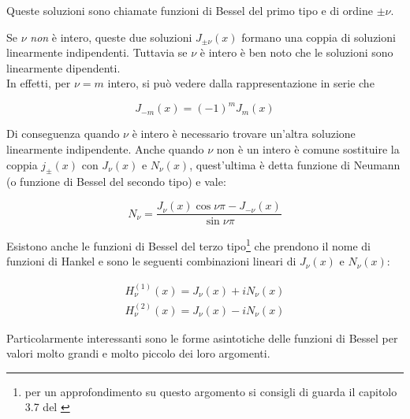 Queste soluzioni sono chiamate funzioni di Bessel del primo tipo e di ordine $\pm \nu$. 

Se $\nu$ \emph{non} è intero, queste due soluzioni $J_{\pm \nu} (x)$ formano una coppia di soluzioni linearmente indipendenti. Tuttavia se $\nu$ è intero è ben noto che le soluzioni sono linearmente dipendenti. \\
In effetti, per $\nu = m$ intero, si può vedere dalla rappresentazione in serie che 

\begin{equation}
    J_{-m}(x) = (-1)^m J_m(x)
\end{equation}

Di conseguenza quando $\nu$ è intero è necessario trovare un'altra soluzione linearmente indipendente. Anche quando $\nu$ non è un intero è comune sostituire la coppia $j_{\pm}(x)$ con $J_{\nu}(x)$ e $N_{\nu} (x)$, quest'ultima è detta funzione di Neumann (o funzione di Bessel del secondo tipo) e vale: 

\begin{tcolorbox}[colback=yellow!10!white, colframe=orange!70!black, boxrule=0.8pt]
\begin{equation}
    N_{\nu} = \frac{J_{\nu}(x) \cos{\nu \pi} - J_{-\nu} (x)}{\sin{\nu \pi}}
\end{equation}
\end{tcolorbox}

Esistono anche le funzioni di Bessel del terzo tipo\footnote{per un approfondimento su questo argomento si consigli di guarda il capitolo 3.7 del \cite{ElettrodinamicaClassica}} che prendono il nome di funzioni di Hankel e sono le seguenti combinazioni lineari di $J_{\nu}(x)$ e $N_{\nu}(x)$:

\begin{tcolorbox}[colback=yellow!10!white, colframe=orange!70!black, boxrule=0.8pt]
\begin{equation}
\begin{array}{l}
H_\nu^{(1)}(x)=J_\nu(x)+i N_\nu(x) \\
H_\nu^{(2)}(x)=J_\nu(x)-i N_\nu(x)
\end{array}
\end{equation}
\end{tcolorbox}

\newpage

Particolarmente interessanti sono le forme asintotiche delle funzioni di Bessel per valori molto grandi e molto piccolo dei loro argomenti. \\


